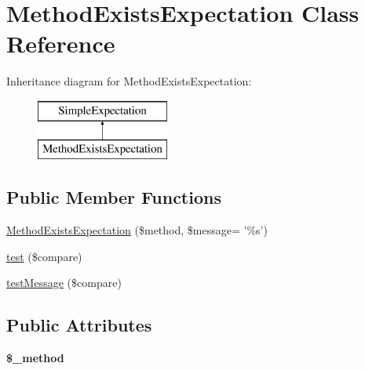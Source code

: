 \hypertarget{class_method_exists_expectation}{
\section{MethodExistsExpectation Class Reference}
\label{class_method_exists_expectation}
}
Inheritance diagram for MethodExistsExpectation:\begin{figure}[H]
\begin{center}
\leavevmode
\includegraphics[height=2.000000cm]{class_method_exists_expectation}
\end{center}
\end{figure}
\subsection*{Public Member Functions}
\begin{DoxyCompactItemize}
\item 
\hyperlink{class_method_exists_expectation_a1fcc8efdc29de2ea492548fa5add2fc2}{MethodExistsExpectation} (\$method, \$message= '\%s')
\item 
\hyperlink{class_method_exists_expectation_a951ee8d86b351ad3b467ea57673526d3}{test} (\$compare)
\item 
\hyperlink{class_method_exists_expectation_a858774c75ad642a628c27a08adb9983b}{testMessage} (\$compare)
\end{DoxyCompactItemize}
\subsection*{Public Attributes}
\begin{DoxyCompactItemize}
\item 
\hypertarget{class_method_exists_expectation_aa1f7fc85685b1475da52f22fc030ad24}{
{\bfseries \$\_\-method}}
\label{class_method_exists_expectation_aa1f7fc85685b1475da52f22fc030ad24}

\end{DoxyCompactItemize}


